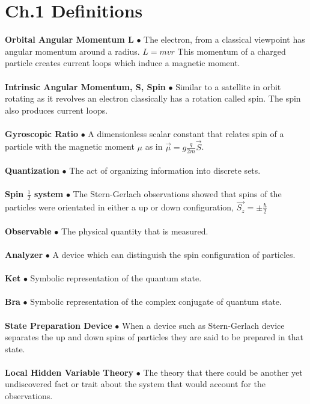 \documentclass[paper=a4, fontsize=11pt]{scrartcl} %
\numberwithin{equation}{section} %
\numberwithin{figure}{section} %
\numberwithin{table}{section} %
\begin{document}
\section{Ch.1 Definitions}
\textbf{Orbital Angular Momentum L} $\bullet$ The electron, from a classical viewpoint has angular momentum around a radius. $L = mvr$ This momentum of a charged particle creates current loops which induce a magnetic moment.\\
\\
 \textbf{Intrinsic Angular Momentum, S, Spin} $\bullet$ Similar to a satellite in orbit rotating as it revolves an electron classically has a rotation called spin. The spin also produces current loops.\\
\\ 
 \textbf{Gyroscopic Ratio} $\bullet$ A dimensionless scalar constant that relates spin of a particle with the magnetic moment $\mu$ as in $\vec{\mu} = g\frac{q}{2m}\vec{S}$.\\
\\
\textbf{Quantization} $\bullet$ The act of organizing information into discrete sets.\\
\\
\textbf{Spin $\frac{1}{2}$ system} $\bullet$ The Stern-Gerlach observations showed that spins of the particles were orientated in either a up or down configuration, $\vec{S_z}= \pm \frac{\hbar}{2} $\\
\\ 
 \textbf{Observable} $\bullet$ The physical quantity that is measured.\\
 \\
 \textbf{Analyzer} $\bullet$ A device which can distinguish the spin configuration of particles.\\
 \\
 \textbf{Ket} $\bullet$ Symbolic representation of the quantum state.\\
 \\
 \textbf{Bra} $\bullet$ Symbolic representation of the complex conjugate of quantum state.\\
 \\
 \textbf{State Preparation Device} $\bullet$ When a device such as Stern-Gerlach device separates the up and down spins of particles they are said to be prepared in that state. \\
 \\
 \textbf{Local Hidden Variable Theory} $\bullet$ The theory that there could be another yet undiscovered fact or trait about the system that would account for the observations.\\
\end{document}
